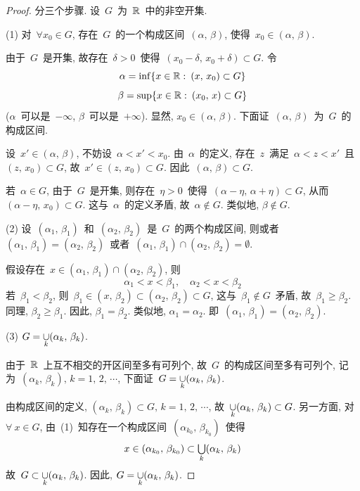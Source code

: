 \begin{proof}
分三个步骤. 设~$G$~为~$\mathbb{R}$~中的非空开集.

(1) 对~$\forall x_0 \in G$, 存在~$G$~的一个构成区间~$(\alpha,\,\beta)$, 使得~$x_0 \in (\alpha,\,\beta)$.

由于~$G$~是开集, 故存在~$\delta > 0$~使得~$(x_0 - \delta,\,x_0 + \delta) \subset G$. 令
\[
\alpha = \inf\{x \in \mathbb{R}:\: (x,\,x_0) \subset G\}
\]
\[
\beta = \sup\{x \in \mathbb{R}:\: (x_0,\,x) \subset G\}
\]
($\alpha$~可以是~$-\infty$, $\beta$~可以是~$+ \infty$). 显然, $x_0 \in (\alpha,\,\beta)$. 下面证~$(\alpha,\,\beta)$~为~$G$~的构成区间.

设~$x' \in (\alpha,\,\beta)$, 不妨设~$\alpha < x' < x_0$. 由~$\alpha$~的定义, 存在~$z$~满足~$\alpha < z < x'$~且~$(z,\,x_0) \subset G$, 故~$x' \in (z,\,x_0) \subset G$. 因此~$(\alpha,\,\beta) \subset G$.

若~$\alpha \in G$, 由于~$G$~是开集, 则存在~$\eta > 0$~使得~$(\alpha - \eta,\,\alpha + \eta) \subset G$,  从而~$(\alpha - \eta,\,x_0) \subset G$. 这与~$\alpha$~的定义矛盾, 故~$\alpha \notin G$. 类似地, $\beta \notin G$.

(2) 设~$(\alpha_1,\,\beta_1)$~和~$(\alpha_2,\,\beta_2)$~是~$G$~的两个构成区间,
则或者~$(\alpha_1,\,\beta_1) = (\alpha_2,\,\beta_2)$~或者~$(\alpha_1,\,\beta_1) \cap (\alpha_2,\,\beta_2) = \emptyset$.

假设存在~$x \in (\alpha_1,\,\beta_1) \cap (\alpha_2,\,\beta_2)$, 则
\[
\alpha_1 < x < \beta_1, \quad \alpha_2 < x < \beta_2
\]
若~$\beta_1 < \beta_2$, 则~$\beta_1 \in (x,\,\beta_2) \subset (\alpha_2,\,\beta_2) \subset G$,  这与~$\beta_1 \notin G$~矛盾, 故~$\beta_1 \geqslant \beta_2$. 同理, $\beta_2 \geqslant \beta_1$. 因此, $\beta_1 = \beta_2$. 类似地, $\alpha_1 = \alpha_2$. 即~$(\alpha_1,\,\beta_1) = (\alpha_2,\,\beta_2)$.

(3) $G = \mathop{\cup}\limits_k (\alpha_k,\,\beta_k)$.

由于~$\mathbb{R}$~上互不相交的开区间至多有可列个, 故~$G$~的构成区间至多有可列个,
记为~$(\alpha_k,\,\beta_k),\, k=1,\,2,\,\cdots$, 下面证~$G = \mathop{\cup}\limits_k (\alpha_k,\,\beta_k)$.

由构成区间的定义, $(\alpha_k,\,\beta_k) \subset G, \, k=1,\,2,\,\cdots$, 故~$\mathop{\cup}\limits_k (\alpha_k,\,\beta_k) \subset G$. 另一方面, 对~$\forall~x \in G$, 由~(1)~知存在一个构成区间~$(\alpha_{k_0},\,\beta_{k_0})$~使得
\[
x \in (\alpha_{k_0},\,\beta_{k_0}) \subset \mathop{\textstyle{\bigcup}}_k (\alpha_k,\,\beta_k)
\]
故~$G \subset \mathop{\cup}\limits_k (\alpha_k,\,\beta_k)$. 因此, $G = \mathop{\cup}\limits_k (\alpha_k,\,\beta_k)$.
\end{proof}

